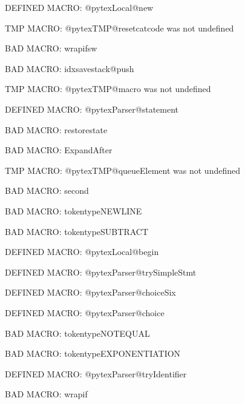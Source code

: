 \ifx\@pytexLocal@new\undefined\else DEFINED MACRO: @pytexLocal@new
\fi

\ifx\@pytexTMP@resetcatcode\undefined\else TMP MACRO: @pytexTMP@resetcatcode was not undefined
\fi

BAD MACRO: wrapifsw

BAD MACRO: idxsavestack@push

\ifx\@pytexTMP@macro\undefined\else TMP MACRO: @pytexTMP@macro was not undefined
\fi

\ifx\@pytexParser@statement\undefined\else DEFINED MACRO: @pytexParser@statement
\fi

BAD MACRO: restorestate

BAD MACRO: ExpandAfter

\ifx\@pytexTMP@queueElement\undefined\else TMP MACRO: @pytexTMP@queueElement was not undefined
\fi

BAD MACRO: second

BAD MACRO: tokentypeNEWLINE

BAD MACRO: tokentypeSUBTRACT

\ifx\@pytexLocal@begin\undefined\else DEFINED MACRO: @pytexLocal@begin
\fi

\ifx\@pytexParser@trySimpleStmt\undefined\else DEFINED MACRO: @pytexParser@trySimpleStmt
\fi

\ifx\@pytexParser@choiceSix\undefined\else DEFINED MACRO: @pytexParser@choiceSix
\fi

\ifx\@pytexParser@choice\undefined\else DEFINED MACRO: @pytexParser@choice
\fi

BAD MACRO: tokentypeNOTEQUAL

BAD MACRO: tokentypeEXPONENTIATION

\ifx\@pytexParser@tryIdentifier\undefined\else DEFINED MACRO: @pytexParser@tryIdentifier
\fi

BAD MACRO: wrapif

